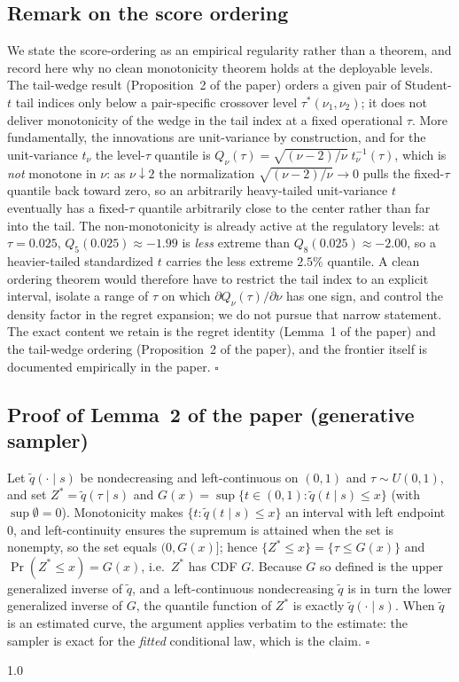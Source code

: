 \documentclass[11pt]{article}
\begin{document}
\subsection*{Remark on the score ordering}
We state the score-ordering as an empirical regularity rather than a
theorem, and record here why no clean monotonicity theorem holds at the
deployable levels. The tail-wedge result (Proposition~2 of the paper)
orders a given pair of Student-$t$ tail indices only below a pair-specific
crossover level $\tau^*(\nu_1,\nu_2)$; it does not deliver monotonicity of
the wedge in the tail index at a fixed operational $\tau$. More
fundamentally, the innovations are unit-variance by construction, and for
the unit-variance $t_\nu$ the level-$\tau$ quantile is
$Q_\nu(\tau)=\sqrt{(\nu-2)/\nu}\;t_\nu^{-1}(\tau)$, which is \emph{not}
monotone in $\nu$: as $\nu\downarrow2$ the normalization
$\sqrt{(\nu-2)/\nu}\to0$ pulls the fixed-$\tau$ quantile back toward zero,
so an arbitrarily heavy-tailed unit-variance $t$ eventually has a
fixed-$\tau$ quantile arbitrarily close to the center rather than far into
the tail. The non-monotonicity is already active at the regulatory levels:
at $\tau=0.025$, $Q_5(0.025)\approx-1.99$ is \emph{less} extreme than
$Q_8(0.025)\approx-2.00$, so a heavier-tailed standardized $t$ carries the
less extreme $2.5\%$ quantile. A clean ordering theorem would therefore
have to restrict the tail index to an explicit interval, isolate a range
of $\tau$ on which $\partial Q_\nu(\tau)/\partial\nu$ has one sign, and
control the density factor in the regret expansion; we do not pursue that
narrow statement. The exact content we retain is the regret identity
(Lemma~1 of the paper) and the tail-wedge ordering (Proposition~2 of the
paper), and the frontier itself is documented empirically in the paper.
\hfill$\square$



\subsection*{Proof of Lemma~2 of the paper (generative sampler)}
Let $\widetilde{q}(\cdot \mid s)$ be nondecreasing and left-continuous
on $(0,1)$ and $\tau \sim U(0,1)$, and set
$Z^*=\widetilde q(\tau\mid s)$ and
$G(x)=\sup\{t\in(0,1):\widetilde q(t\mid s)\le x\}$ (with
$\sup\emptyset=0$). Monotonicity makes
$\{t:\widetilde q(t\mid s)\le x\}$ an interval with left endpoint $0$,
and left-continuity ensures the supremum is attained when the set is
nonempty, so the set equals $(0,G(x)]$; hence
$\{Z^*\le x\}=\{\tau\le G(x)\}$ and
$\Pr(Z^*\le x)=G(x)$, i.e.\ $Z^*$ has CDF $G$. Because $G$ so defined
is the upper generalized inverse of $\widetilde q$, and a
left-continuous nondecreasing $\widetilde q$ is in turn the lower
generalized inverse of $G$, the quantile function of $Z^*$ is exactly
$\widetilde q(\cdot\mid s)$. When $\widetilde q$ is an estimated curve,
the argument applies verbatim to the estimate: the sampler is exact for
the \emph{fitted} conditional law, which is the claim. $\square$

\begin{spacing}{1.0}


\end{spacing}
\end{document}
